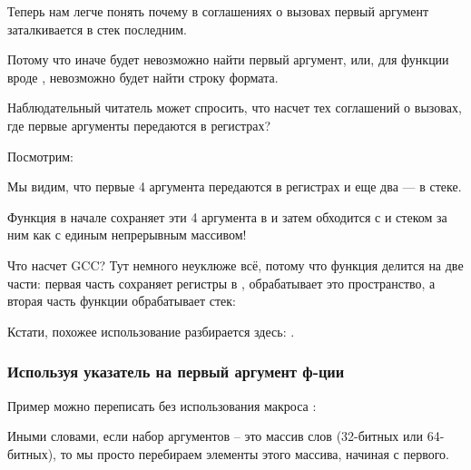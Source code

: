 Теперь нам легче понять почему в соглашениях о вызовах  первый аргумент 
заталкивается в стек последним.

Потому что иначе будет невозможно найти первый аргумент, или, для функции вроде \printf, невозможно
будет найти строку формата.

\label{variadic_arith_registers}

Наблюдательный читатель может спросить, что насчет тех соглашений о вызовах, где первые аргументы передаются
в регистрах?

Посмотрим:



Мы видим, что первые 4 аргумента передаются в регистрах и еще два --- в стеке.

Функция  в начале сохраняет эти 4 аргумента в  и затем обходится
с  и стеком за ним как с единым непрерывным массивом!

Что насчет GCC? Тут немного неуклюже всё, потому что функция делится на две части: первая часть
сохраняет регистры в , обрабатывает это пространство, а вторая часть функции обрабатывает стек:



Кстати, похожее использование  разбирается здесь: .

\subsubsection{Используя указатель на первый аргумент ф-ции}

Пример можно переписать без использования макроса :



Иными словами, если набор аргументов -- это массив слов (32-битных или 64-битных), то мы просто перебираем элементы
этого массива, начиная с первого.

